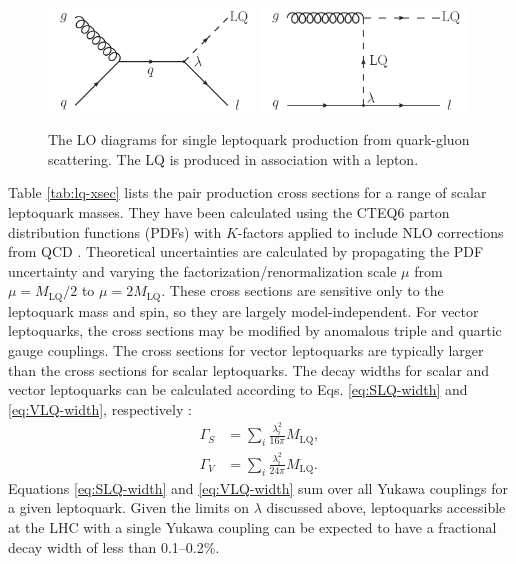 \documentclass[12pt]{thesis}  %
\newcommand{\MLQ}{\ensuremath{M_{\text{LQ}}}\xspace}
\begin{document}
\begin{figure}[hbt]
\begin{center}
\includegraphics[width=0.49\textwidth]{figures/LO_FD_single_LQ_a.pdf}
\includegraphics[width=0.49\textwidth]{figures/LO_FD_single_LQ_b.pdf}
\caption{The LO diagrams for single leptoquark production from quark-gluon scattering. The LQ is produced in association with a lepton.}
\label{fig:lq-single}
\end{center}
\end{figure}

Table \ref{tab:lq-xsec} lists the pair production cross sections for a range of scalar leptoquark masses. They have been calculated using the CTEQ6 parton distribution functions (PDFs) \cite{CTEQ6r1,CTEQ6r2} with $K$-factors applied to include NLO corrections from QCD \cite{LQxsec}. Theoretical uncertainties are calculated by propagating the PDF uncertainty and varying the factorization/renormalization scale $\mu$ from $\mu=\MLQ/2$ to $\mu=2\MLQ$. These cross sections are sensitive only to the leptoquark mass and spin, so they are largely model-independent. For vector leptoquarks, the cross sections may be modified by anomalous triple and quartic gauge couplings. The cross sections for vector leptoquarks are typically larger than the cross sections for scalar leptoquarks. The decay widths for scalar and vector leptoquarks can be calculated according to Eqs. \eqref{eq:SLQ-width} and \eqref{eq:VLQ-width}, respectively \cite{BRW}:
\begin{align}
\label{eq:SLQ-width} \Gamma_{S} &= \sum_{i}{\frac{\lambda_{i}^{2}}{16\pi}\MLQ}, \\
\label{eq:VLQ-width} \Gamma_{V} &= \sum_{i}{\frac{\lambda_{i}^{2}}{24\pi}\MLQ}.
\end{align}
Equations \eqref{eq:SLQ-width} and \eqref{eq:VLQ-width} sum over all Yukawa couplings for a given leptoquark. Given the limits on $\lambda$ discussed above, leptoquarks accessible at the LHC with a single Yukawa coupling can be expected to have a fractional decay width of less than 0.1--0.2\%.
\end{document}
